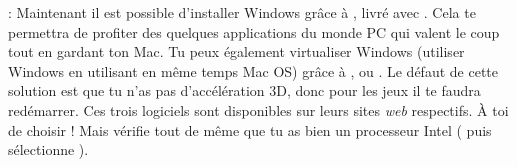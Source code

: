 



  : Maintenant il est possible d'installer Windows gr\^ace \`a  , livr\'e avec . Cela te permettra de profiter des quelques applications du monde PC qui valent le coup tout en gardant ton Mac. Tu peux \'egalement virtualiser Windows (utiliser Windows en utilisant en m\^eme temps Mac OS) gr\^ace \`a  ,  ou . Le  d\'efaut de cette solution est que tu n'as pas d'acc\'el\'eration 3D, donc pour les jeux il te faudra red\'emarrer. Ces trois logiciels sont disponibles sur leurs sites \emph{web} respectifs. \`A toi de choisir !
Mais v\'erifie tout de m\^eme que tu as bien un processeur Intel ( puis s\'electionne ).

\clearpage
